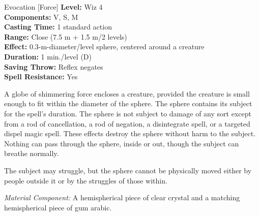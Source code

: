 {Evocation [Force]}
{
	\textbf{Level:}
	Wiz 4\\
	\textbf{Components:}
	V, S, M\\
	\textbf{Casting Time:}
	1 standard action\\
	\textbf{Range:}
	Close (7.5 m + 1.5 m/2 levels)\\
	\textbf{Effect:}
	0.3-m-diameter/level sphere, centered around a creature\\
	\textbf{Duration:}
	1 min./level (D)\\
	\textbf{Saving Throw:}
	Reflex negates\\
	\textbf{Spell Resistance:}
	Yes\\
}
{
	A globe of shimmering force encloses a creature, provided the creature is small enough to fit within the diameter of the sphere. The sphere contains its subject for the spell's duration. The sphere is not subject to damage of any sort except from a rod of cancellation, a rod of negation, a disintegrate spell, or a targeted dispel magic spell. These effects destroy the sphere without harm to the subject. Nothing can pass through the sphere, inside or out, though the subject can breathe normally.

	The subject may struggle, but the sphere cannot be physically moved either by people outside it or by the struggles of those within.

	\textit{Material Component:}
	A hemispherical piece of clear crystal and a matching hemispherical piece of gum arabic.

}
